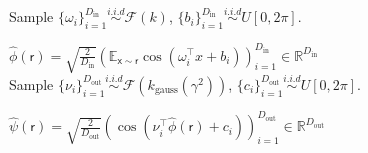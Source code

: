 \documentclass[25pt, a0paper, portrait, margin=0mm, innermargin=10mm,
     blockverticalspace=7mm, colspace=8mm, subcolspace=8mm]{tikzposter} %
\begin{document}
\begin{columns}
{\begin{spacing}{1.3}
\begin{algorithmic}[1]
\STATE Sample  $\{ \omega_i \}_{i=1}^{D_\mathrm{in}} \overset{i.i.d}{\sim} \mathscr{F}(k)$,
\hspace{2cm}
$\{b_i\}_{i=1}^{D_\mathrm{in}} \overset{i.i.d}{\sim} U[0, 2\pi] $.



\STATE $\hat{\phi}(\mathsf{r}) = \sqrt{\frac{2}{D_\mathrm{in}}} \left(
\mathbb{E}_{\mathsf{x \sim \mathsf{r}}} 
\cos(\omega_{i}^{\top}x+b_{i} ) \right)_{i=1}^{D_\mathrm{in}} \in \mathbb{R}^{D_\mathrm{in}}$ \\
%
%
\STATE Sample $\{ \nu_i \}_{i=1}^{D_\mathrm{out}} \overset{i.i.d}{\sim}
\mathscr{F}({k}_{\text{gauss}}(\gamma^{2}))$, \hspace{2cm}
$\{c_i\}_{i=1}^{D_\mathrm{out}} \overset{i.i.d}{\sim} U[0, 2\pi] $.


\STATE $\hat{\psi}(\mathsf{r}) = \sqrt{\frac{2}{D_\mathrm{out}}} \left(  
\cos(\nu_{i}^{\top} \hat{\phi}(\mathsf{r}) + c_{i} ) \right)_{i=1}^{D_\mathrm{out}} \in 
\mathbb{R}^{D_\mathrm{out}}$
\end{algorithmic}
\end{spacing}

}
\end{columns}
\end{document}
